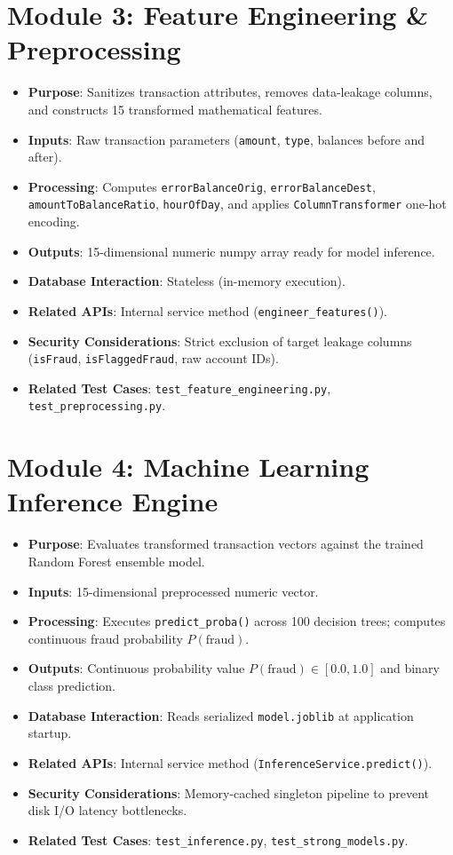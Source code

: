 \section{Module 3: Feature Engineering \& Preprocessing}
\begin{itemize}
    \item \textbf{Purpose}: Sanitizes transaction attributes, removes data-leakage columns, and constructs 15 transformed mathematical features.
    \item \textbf{Inputs}: Raw transaction parameters (\texttt{amount}, \texttt{type}, balances before and after).
    \item \textbf{Processing}: Computes \texttt{errorBalanceOrig}, \texttt{errorBalanceDest}, \texttt{amountToBalanceRatio}, \texttt{hourOfDay}, and applies \texttt{ColumnTransformer} one-hot encoding.
    \item \textbf{Outputs}: 15-dimensional numeric numpy array ready for model inference.
    \item \textbf{Database Interaction}: Stateless (in-memory execution).
    \item \textbf{Related APIs}: Internal service method (\texttt{engineer\_features()}).
    \item \textbf{Security Considerations}: Strict exclusion of target leakage columns (\texttt{isFraud}, \texttt{isFlaggedFraud}, raw account IDs).
    \item \textbf{Related Test Cases}: \texttt{test\_feature\_engineering.py}, \texttt{test\_preprocessing.py}.
\end{itemize}

\section{Module 4: Machine Learning Inference Engine}
\begin{itemize}
    \item \textbf{Purpose}: Evaluates transformed transaction vectors against the trained Random Forest ensemble model.
    \item \textbf{Inputs}: 15-dimensional preprocessed numeric vector.
    \item \textbf{Processing}: Executes \texttt{predict\_proba()} across 100 decision trees; computes continuous fraud probability $P(\text{fraud})$.
    \item \textbf{Outputs}: Continuous probability value $P(\text{fraud}) \in [0.0, 1.0]$ and binary class prediction.
    \item \textbf{Database Interaction}: Reads serialized \texttt{model.joblib} at application startup.
    \item \textbf{Related APIs}: Internal service method (\texttt{InferenceService.predict()}).
    \item \textbf{Security Considerations}: Memory-cached singleton pipeline to prevent disk I/O latency bottlenecks.
    \item \textbf{Related Test Cases}: \texttt{test\_inference.py}, \texttt{test\_strong\_models.py}.
\end{itemize}

